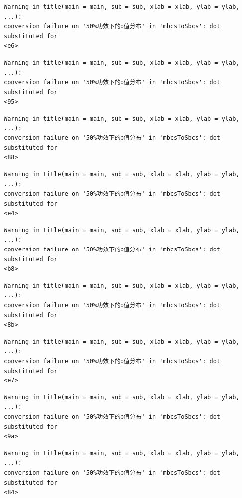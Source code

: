 \documentclass[
  letterpaper,
  DIV=11,
  numbers=noendperiod]{scrreprt}
\begin{document}
\begin{verbatim}
Warning in title(main = main, sub = sub, xlab = xlab, ylab = ylab, ...):
conversion failure on '50%功效下的p值分布' in 'mbcsToSbcs': dot substituted for
<e6>
\end{verbatim}

\begin{verbatim}
Warning in title(main = main, sub = sub, xlab = xlab, ylab = ylab, ...):
conversion failure on '50%功效下的p值分布' in 'mbcsToSbcs': dot substituted for
<95>
\end{verbatim}

\begin{verbatim}
Warning in title(main = main, sub = sub, xlab = xlab, ylab = ylab, ...):
conversion failure on '50%功效下的p值分布' in 'mbcsToSbcs': dot substituted for
<88>
\end{verbatim}

\begin{verbatim}
Warning in title(main = main, sub = sub, xlab = xlab, ylab = ylab, ...):
conversion failure on '50%功效下的p值分布' in 'mbcsToSbcs': dot substituted for
<e4>
\end{verbatim}

\begin{verbatim}
Warning in title(main = main, sub = sub, xlab = xlab, ylab = ylab, ...):
conversion failure on '50%功效下的p值分布' in 'mbcsToSbcs': dot substituted for
<b8>
\end{verbatim}

\begin{verbatim}
Warning in title(main = main, sub = sub, xlab = xlab, ylab = ylab, ...):
conversion failure on '50%功效下的p值分布' in 'mbcsToSbcs': dot substituted for
<8b>
\end{verbatim}

\begin{verbatim}
Warning in title(main = main, sub = sub, xlab = xlab, ylab = ylab, ...):
conversion failure on '50%功效下的p值分布' in 'mbcsToSbcs': dot substituted for
<e7>
\end{verbatim}

\begin{verbatim}
Warning in title(main = main, sub = sub, xlab = xlab, ylab = ylab, ...):
conversion failure on '50%功效下的p值分布' in 'mbcsToSbcs': dot substituted for
<9a>
\end{verbatim}

\begin{verbatim}
Warning in title(main = main, sub = sub, xlab = xlab, ylab = ylab, ...):
conversion failure on '50%功效下的p值分布' in 'mbcsToSbcs': dot substituted for
<84>
\end{verbatim}
\end{document}
